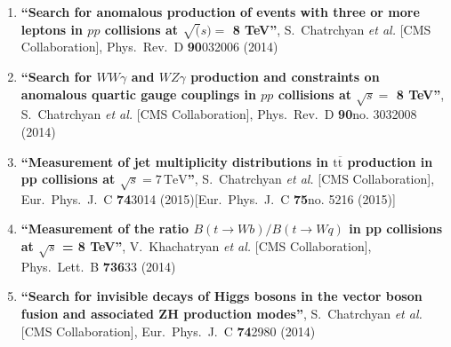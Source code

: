 \begin{enumerate}
\item%
{\bf ``Search for anomalous production of events with three or more leptons in $pp$ collisions at $\sqrt(s) =$ 8 TeV''}, 
  S.~Chatrchyan {\it et al.}  [CMS Collaboration], 
Phys.\ Rev.\ D {\bf 90}032006 (2014) %


\item%
{\bf ``Search for $WW \gamma$ and $WZ \gamma$ production and constraints on anomalous quartic gauge couplings in $pp$ collisions at $\sqrt s =$ 8 TeV''}, 
  S.~Chatrchyan {\it et al.}  [CMS Collaboration], 
Phys.\ Rev.\ D {\bf 90}no. 3032008 (2014) %


\item%
{\bf ``Measurement of jet multiplicity distributions in $\mathrm {t}\overline{\mathrm {t}}$ production in pp collisions at $\sqrt{s} = 7\,\text {TeV} $''}, 
  S.~Chatrchyan {\it et al.}  [CMS Collaboration], 
Eur.\ Phys.\ J.\ C {\bf 74}3014 (2015)[Eur.\ Phys.\ J.\ C {\bf 75}no. 5216 (2015)] %


\item%
{\bf ``Measurement of the ratio $B(t \to Wb)/B(t \to Wq)$ in pp collisions at $\sqrt{s}$ = 8 TeV''}, 
  V.~Khachatryan {\it et al.}  [CMS Collaboration], 
Phys.\ Lett.\ B {\bf 736}33 (2014) %


\item%
{\bf ``Search for invisible decays of Higgs bosons in the vector boson fusion and associated ZH production modes''}, 
  S.~Chatrchyan {\it et al.}  [CMS Collaboration], 
Eur.\ Phys.\ J.\ C {\bf 74}2980 (2014) %



\end{enumerate}
